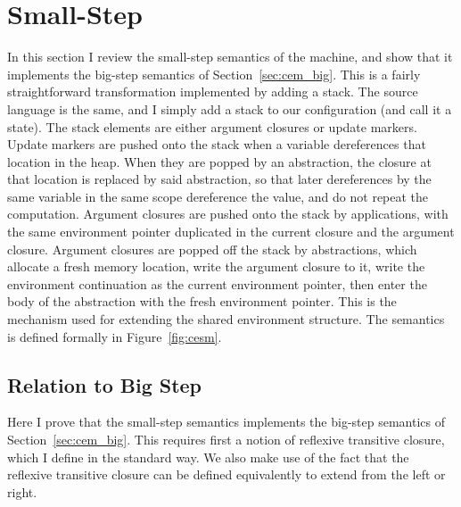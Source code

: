 \section{Small-Step \ce} \label{sec:cem_small}

In this section I review the small-step semantics of the \ce 
machine, and show that it implements the big-step semantics of
Section~\ref{sec:cem_big}. This is a fairly straightforward transformation implemented
by adding a stack. The source language is the same, and I simply add a stack to
our configuration (and call it a state). The stack elements are either argument
closures or update markers. Update markers are pushed onto the stack when a
variable dereferences that location in the heap. When they are popped by an
abstraction, the closure at that location is replaced by said abstraction, so
that later dereferences by the same variable in the same scope dereference the
value, and do not repeat the computation.  Argument closures are pushed onto the
stack by applications, with the same environment pointer duplicated in the
current closure and the argument closure.  Argument closures are popped off the
stack by abstractions, which allocate a fresh memory location, write the
argument closure to it, write the environment continuation as the current
environment pointer, then enter the body of the abstraction with the fresh
environment pointer. This is the mechanism used for extending the shared
environment structure. The semantics is defined formally in
Figure~\ref{fig:cesm}.  

\subsection{Relation to Big Step} \label{sec:cem_cesm}
Here I prove that the small-step semantics implements the big-step semantics of
Section~\ref{sec:cem_big}. This requires first a notion of reflexive transitive closure,
which I define in the standard way. We also make use of the fact that the
reflexive transitive closure can be defined equivalently to extend from the left
or right. 

